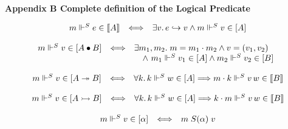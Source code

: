 

 
\par\medskip\noindent\textbf{Appendix B Complete definition of the Logical Predicate}\par
 
  
\par  \quad  \[\begin{array}[]{lcl}m\Vdash^{S}e\in\llbracket A\rrbracket&\Longleftrightarrow&\exists v.\,e\mathrel{\hookrightarrow}v\land m\Vdash^{S}v\in[A]\end{array}\]\quad  \quad  
  
 
  
\par  \quad  \[\begin{array}[]{lcl}m\Vdash^{S}v\in[A\bullet B]&\Longleftrightarrow&\hskip-5.0pt\begin{array}[t]{l}\exists m_{1},m_{2}.\;m=m_{1}\cdot m_{2}\land v=(v_{1},v_{2})\\
\quad\land\nobreak\ m_{1}\Vdash^{S}v_{1}\in[A]\land m_{2}\Vdash^{S}v_{2}\in[B]\end{array}\end{array}\]\quad  \quad  
  
 
  
\par  \quad  \[\begin{array}[]{lcl}m\Vdash^{S}v\in[A\twoheadrightarrow B]&\Longleftrightarrow&\forall k.\,k\Vdash^{S}w\in[A]\Longrightarrow m\cdot k\Vdash^{S}v\,w\in\llbracket B\rrbracket\end{array}\]\quad  \quad  
  
 
  
\par  \quad  \[\begin{array}[]{lcl}m\Vdash^{S}v\in[A\rightarrowtail B]&\Longleftrightarrow&\forall k.\,k\Vdash^{S}w\in[A]\Longrightarrow k\cdot m\Vdash^{S}v\,w\in\llbracket B\rrbracket\end{array}\]\quad  \quad  
  
 
  
\par  \quad  \[\begin{array}[]{lcl}m\Vdash^{S}v\in[\alpha]&\Longleftrightarrow&m\mathrel{S(\alpha)}v\end{array}\]\quad  \quad  
  
